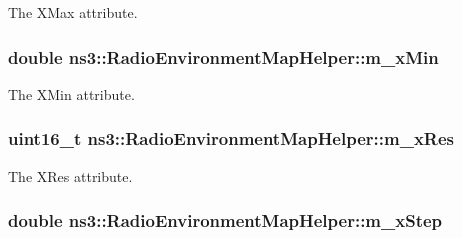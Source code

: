 The {\ttfamily X\+Max} attribute. 

\subsubsection[{\texorpdfstring{m\+\_\+x\+Min}{m_xMin}}]{\setlength{\rightskip}{0pt plus 5cm}double ns3\+::\+Radio\+Environment\+Map\+Helper\+::m\+\_\+x\+Min\hspace{0.3cm}{\ttfamily [private]}}\hypertarget{classns3_1_1RadioEnvironmentMapHelper_ad164d05e2fb8ffebea24ea33d0fc384b}{}\label{classns3_1_1RadioEnvironmentMapHelper_ad164d05e2fb8ffebea24ea33d0fc384b}


The {\ttfamily X\+Min} attribute. 

\subsubsection[{\texorpdfstring{m\+\_\+x\+Res}{m_xRes}}]{\setlength{\rightskip}{0pt plus 5cm}uint16\+\_\+t ns3\+::\+Radio\+Environment\+Map\+Helper\+::m\+\_\+x\+Res\hspace{0.3cm}{\ttfamily [private]}}\hypertarget{classns3_1_1RadioEnvironmentMapHelper_a338a6fc67e558a1870fe8815c097a680}{}\label{classns3_1_1RadioEnvironmentMapHelper_a338a6fc67e558a1870fe8815c097a680}


The {\ttfamily X\+Res} attribute. 

\subsubsection[{\texorpdfstring{m\+\_\+x\+Step}{m_xStep}}]{\setlength{\rightskip}{0pt plus 5cm}double ns3\+::\+Radio\+Environment\+Map\+Helper\+::m\+\_\+x\+Step\hspace{0.3cm}{\ttfamily [private]}}\hypertarget{classns3_1_1RadioEnvironmentMapHelper_ab606ef89ff7410315f9dda782b9ca678}{}\label{classns3_1_1RadioEnvironmentMapHelper_ab606ef89ff7410315f9dda782b9ca678}


